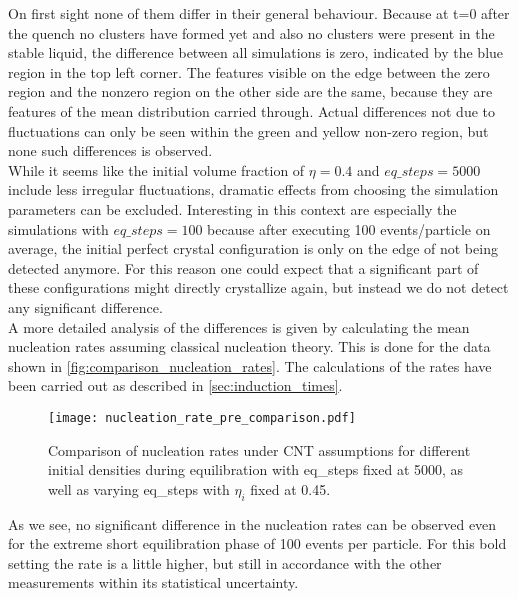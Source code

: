 On first sight none of them differ in their general behaviour. Because at t=0 after the quench no clusters have formed yet and also no clusters were present in the stable liquid, the difference between all simulations is zero, indicated by the blue region in the top left corner. The features visible on the edge between the zero region and the nonzero region on the other side are the same, because they are features of the mean distribution carried through. Actual differences not due to fluctuations can only be seen within the green and yellow non-zero region, but none such differences is observed.\\

While it seems like the initial volume fraction of $\eta=0.4$ and $eq\_steps = 5000$ include less irregular fluctuations, dramatic effects from choosing the simulation parameters can be excluded. Interesting in this context are especially the simulations with $eq\_steps = 100$ because after executing 100 events/particle on average, the initial perfect crystal configuration is only on the edge of not being detected anymore. For this reason one could expect that a significant part of these configurations might directly crystallize again, but instead we do not detect any significant difference.\\

A more detailed analysis of the differences is given by calculating the mean nucleation rates assuming classical nucleation theory. This is done for the data shown in \autoref{fig:comparison_nucleation_rates}. The calculations of the rates have been carried out as described in \autoref{sec:induction_times}.

\begin{figure}[h!]
\centering
\texttt{[image: nucleation\_rate\_pre\_comparison.pdf]}
\caption[Nucleation rate comparison of test measurements]{Comparison of nucleation rates under CNT assumptions for different initial densities during equilibration with eq\_steps fixed at 5000, as well as varying eq\_steps with $\eta_i$ fixed at 0.45. }
\label{fig:comparison_nucleation_rates}
\end{figure}

As we see, no significant difference in the nucleation rates can be observed even for the extreme short equilibration phase of 100 events per particle. For this bold setting the rate is a little higher, but still in accordance with the other measurements within its statistical uncertainty.\\

